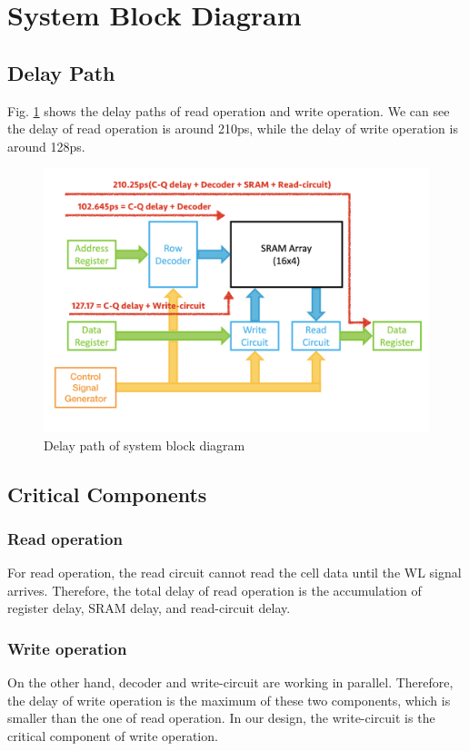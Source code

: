 \documentclass[conference]{IEEEtran}
\begin{document}
\section{System Block Diagram}
\subsection{Delay Path}
Fig. \ref{delay_path} shows the delay paths of read operation and write operation. We can see the delay of read operation is around 210ps, while the delay of write operation is around 128ps.

\begin{figure}[h!]
\centering
\includegraphics[clip,width=\columnwidth]{delay_path.png}
\caption{Delay path of system block diagram}
\label{delay_path}
\end{figure}

\subsection{Critical Components}
\subsubsection{Read operation}
For read operation, the read circuit cannot read the cell data until the WL signal arrives. Therefore, the total delay of read operation is the accumulation of register delay, SRAM delay, and read-circuit delay.
\subsubsection{Write operation}
On the other hand, decoder and write-circuit are working in parallel. Therefore, the delay of write operation is the maximum of these two components, which is smaller than the one of read operation. In our design, the write-circuit is the critical component of write operation.
\end{document}
